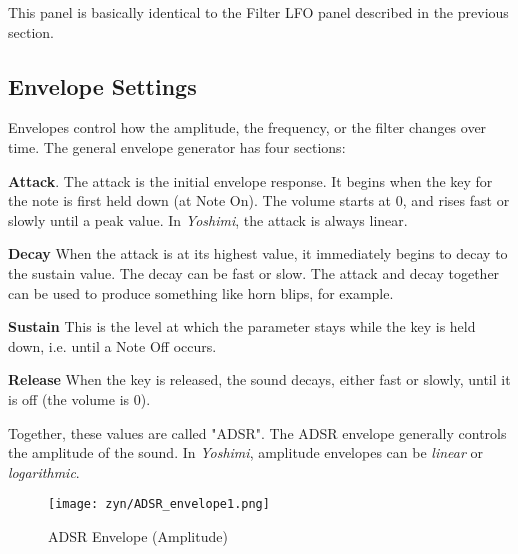    This panel is basically identical to the Filter LFO panel described
   in the previous section.


\subsection{Envelope Settings}
\label{subsec:envelope_settings}

   Envelopes control how the amplitude, the frequency, or the filter changes
   over time.  The general envelope generator has four sections:

   \begin{enumber}
      \item \textbf{Attack}.
         \label{ref:attack}
         The attack is the initial envelope response. 
         It begins when the key for the note is first held down
         (at Note On).
         The volume starts at 0, and rises fast or slowly until a peak value.
         In \textsl{Yoshimi}, the attack is always linear.
      \item \textbf{Decay}
         \label{ref:decay}
         When the attack is at its highest value, it immediately begins
         to decay to the sustain value.  The decay can be fast or slow.
         The attack and decay together can be used to produce something like
         horn blips, for example.
      \item \textbf{Sustain}
         \label{ref:sustain}
         This is the level at which the parameter stays while the key is
         held down, i.e. until a Note Off occurs.
      \item \textbf{Release}
         \label{ref:release}
         When the key is released, the sound decays, either fast or slowly,
         until it is off (the volume is 0).
   \end{enumber}

   Together, these values are called "ADSR".  
   The ADSR envelope generally controls the amplitude of the sound.
   In \textsl{Yoshimi},
   amplitude envelopes can be \textsl{linear} or \textsl{logarithmic}.

\begin{figure}[H]
   \centering 
   \texttt{[image: zyn/ADSR\_envelope1.png]}
   \caption{ADSR Envelope (Amplitude)}
   \label{fig:adsr_envelope_depiction}
\end{figure}

